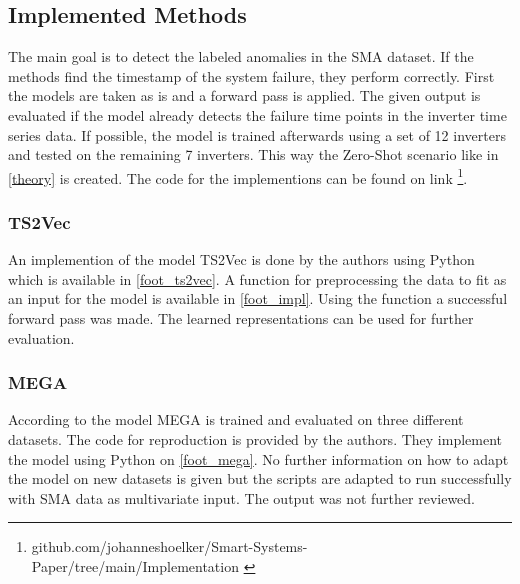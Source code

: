 
\subsection{Implemented Methods}
The main goal is to detect the labeled anomalies in the SMA dataset. If the methods find the timestamp of the system failure, they perform correctly. First the models are taken as is and a forward pass is applied. The given output is evaluated if the model already detects the failure time points in the inverter time series data. If possible, the model is trained afterwards using a set of 12 inverters and tested on the remaining 7 inverters. This way the Zero-Shot scenario like in \autoref{theory} is created.
The code for the implementions can be found on link \footnote{\fussy\tiny github.com/johanneshoelker/Smart-Systems-Paper/tree/main/Implementation \label{foot_impl}}.

\subsubsection{TS2Vec}
An implemention of the model TS2Vec is done by the authors using Python which is available in \autoref{foot_ts2vec}. A function for preprocessing the data to fit as an input for the model is available in \autoref{foot_impl}.
Using the function a successful forward pass was made. The learned representations can be used for further evaluation.

\subsubsection{MEGA}
According to \cite{wang_multiscale_2023} the model MEGA is trained and evaluated on three different datasets. The code for reproduction is provided by the authors. They implement the model using Python on \autoref{foot_mega}. No further information on how to adapt the model on new datasets is given but the scripts are adapted to run successfully with SMA data as multivariate input. The output was not further reviewed.

